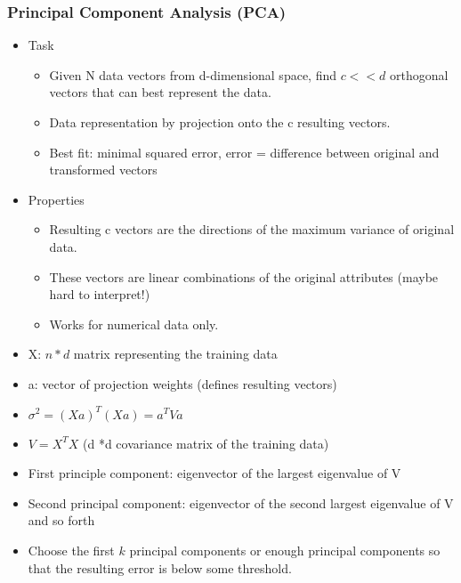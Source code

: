 \documentclass[../notes.tex]{subfiles}
\begin{document}
\subsubsection{Principal Component Analysis (PCA)}
\begin{itemize}
  \item Task
  \begin{itemize}
    \item Given N data vectors from d-dimensional space, find $c << d$ orthogonal vectors that can best represent the data.
    \item Data representation by projection onto the c resulting vectors.
    \item Best fit: minimal squared error, error = difference between original and transformed vectors
  \end{itemize}  

  \item Properties
  \begin{itemize}
    \item Resulting c vectors are the directions of the maximum variance of original data.
    \item These vectors are linear combinations of the original attributes (maybe hard to interpret!)
    \item Works for numerical data only.
  \end{itemize}

  \item X: $n * d$ matrix representing the training data
  \item a: vector of projection weights (defines resulting vectors)
  \item $\sigma^2 = (Xa)^T(Xa) = a^TVa$
  \item $V = X^T X$ (d *d covariance matrix of the training data)
  \item First principle component: eigenvector of the largest eigenvalue of V
  \item Second principal component: eigenvector of the second largest eigenvalue of V and so forth
  \item Choose the first $k$ principal components or enough principal components so that the resulting error is below some threshold.
\end{itemize}
\end{document}
